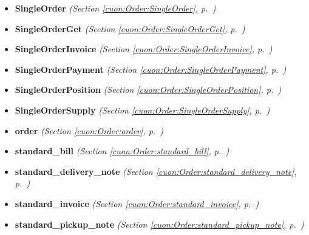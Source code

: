 \begin{itemize}
\setlength{\parskip}{0ex}
\item \textbf{SingleOrder}
  \textit{(Section \ref{cuon:Order:SingleOrder}, p.~\pageref{cuon:Order:SingleOrder})}

\item \textbf{SingleOrderGet}
  \textit{(Section \ref{cuon:Order:SingleOrderGet}, p.~\pageref{cuon:Order:SingleOrderGet})}

\item \textbf{SingleOrderInvoice}
  \textit{(Section \ref{cuon:Order:SingleOrderInvoice}, p.~\pageref{cuon:Order:SingleOrderInvoice})}

\item \textbf{SingleOrderPayment}
  \textit{(Section \ref{cuon:Order:SingleOrderPayment}, p.~\pageref{cuon:Order:SingleOrderPayment})}

\item \textbf{SingleOrderPosition}
  \textit{(Section \ref{cuon:Order:SingleOrderPosition}, p.~\pageref{cuon:Order:SingleOrderPosition})}

\item \textbf{SingleOrderSupply}
  \textit{(Section \ref{cuon:Order:SingleOrderSupply}, p.~\pageref{cuon:Order:SingleOrderSupply})}

\item \textbf{order}
  \textit{(Section \ref{cuon:Order:order}, p.~\pageref{cuon:Order:order})}

\item \textbf{standard\_bill}
  \textit{(Section \ref{cuon:Order:standard_bill}, p.~\pageref{cuon:Order:standard_bill})}

\item \textbf{standard\_delivery\_note}
  \textit{(Section \ref{cuon:Order:standard_delivery_note}, p.~\pageref{cuon:Order:standard_delivery_note})}

\item \textbf{standard\_invoice}
  \textit{(Section \ref{cuon:Order:standard_invoice}, p.~\pageref{cuon:Order:standard_invoice})}

\item \textbf{standard\_pickup\_note}
  \textit{(Section \ref{cuon:Order:standard_pickup_note}, p.~\pageref{cuon:Order:standard_pickup_note})}

\end{itemize}




